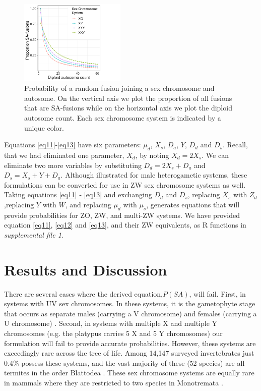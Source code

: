 \documentclass[12pt]{article}
\begin{document}
\begin{figure} 
\includegraphics[width=0.45\textwidth]{autosome.num.pdf}
\centering
\caption{Probability of a random fusion joining a sex chromosome and autosome. On the vertical axis we plot the proportion of all fusions that are SA-fusions while on the horizontal axis we plot the diploid autosome count. Each sex chromosome system is indicated by a unique color.}
\label{autosomenum}
\end{figure}

Equations \ref{eq11}-\ref{eq13} have six parameters: $\mu_d$, $X_s$, $D_a$, $Y$, $D_d$ and $D_s$. Recall, that we had eliminated one parameter, $X_d$, by noting $X_d = 2 X_s$. We can eliminate two more variables by substituting $D_d = 2X_s + D_a$ and $D_s = X_s + Y + D_a$.
Although illustrated for male heterogametic systems, these formulations can be converted for use in ZW sex chromosome systems as well.
Taking equations \ref{eq11} - \ref{eq13} and exchanging $D_d$ and $D_s$, replacing $X_s$ with $Z_d$,replacing $Y$ with $W$, and replacing $\mu_d$ with $\mu_s$, generates equations that will provide probabilities for ZO, ZW, and multi-ZW systems.
We have provided equation \ref{eq11}, \ref{eq12} and \ref{eq13}, and their ZW equivalents, as R functions in \textit{supplemental file 1}.
\section{Results and Discussion}

There are several cases where the derived equation,$P(SA)$, will fail.
First, in systems with UV sex chromosomes. 
In these systems, it is the gametophyte stage that occurs as separate males (carrying a V chromosome) and females (carrying a U chromosome) \citep{bachtrog2014sex}.
Second, in systems with multiple X and multiple Y chromosomes (e.g. the platypus carries 5 X and 5 Y chromosomes) our formulation will fail to provide accurate probabilities.
However, these systems are exceedingly rare across the tree of life.
Among 14,147 surveyed invertebrates just 0.4\% possess these systems, and the vast majority of these (52 species) are all termites in the order Blattodea \citep{blackmon2017}. 
These sex chromosome systems are equally rare in mammals where they are restricted to two species in Monotremata \citep{ashman2014tree}.
\end{document}
